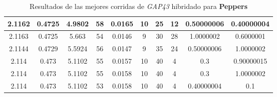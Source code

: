 \begin{table}[h!]
\begin{center}
\begin{tabular}{|c|c|c|c|c|c|c|c|c|c|}
        \hline
        \hline
            2.1162 & 0.4725  & 4.9802 & 58 & 0.0165 & 10 & 25 & 12 & 0.50000006 & 0.40000004\\
        \hline
        \hline
            2.1163 & 0.4725  & 5.663 & 54 & 0.0146 & 9 & 30 & 28 & 1.0000002 & 0.6000001\\
        \hline
        \hline
            2.1144 & 0.4729  & 5.5924 & 56 & 0.0147 & 9 & 35 & 24 & 0.50000006 & 1.0000002\\
        \hline
        \hline
            2.114 & 0.473  & 5.1102 & 55 & 0.0157 & 10 & 40 & 4 & 0.3 & 0.90000015\\
        \hline
        \hline
            2.114 & 0.473  & 5.1102 & 55 & 0.0158 & 10 & 40 & 4 & 0.3 & 1.0000002\\
        \hline
        \hline
            2.114 & 0.473  & 5.1102 & 53 & 0.0158 & 10 & 40 & 4 & 0.40000004 & 0.1\\
        \hline
        \end{tabular}
        \caption{Resultados de las mejores corridas de \emph{GAP43} hibridado para {\bf Peppers}}
        \label{tb:tableGAP43}
    \end{center}
\end{table}
